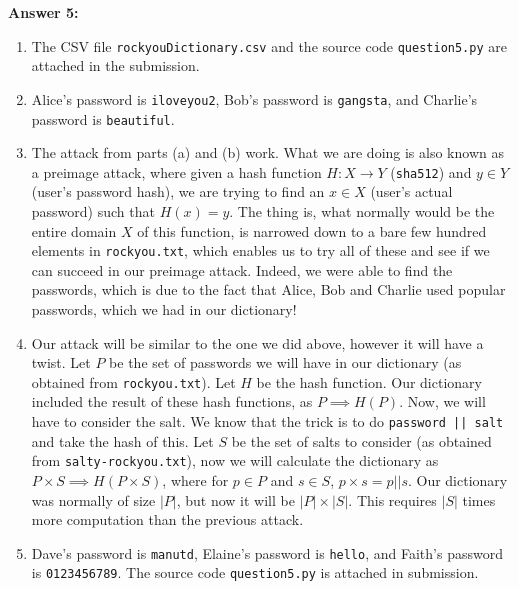 \documentclass[12pt,reqno]{amsart}
\newcommand{\code}[1]{\texttt{#1}}
\begin{document}
\textbf{Answer 5:}
\begin{enumerate}[label=\alph*.]
	\item The CSV file \code{rockyouDictionary.csv} and the source code \code{question5.py} are attached in the submission.
	\item Alice's password is \code{iloveyou2}, Bob's password is \code{gangsta}, and Charlie's password is \code{beautiful}.
	\item The attack from parts (a) and (b) work. What we are doing is also known as a preimage attack, where given a hash function $H : X \xrightarrow{} Y$ (\code{sha512}) and $y \in Y$ (user's password hash), we are trying to find an $x \in X$ (user's actual password) such that $H(x)=y$. The thing is, what normally would be the entire domain $X$ of this function, is narrowed down to a bare few hundred elements in \code{rockyou.txt}, which enables us to try all of these and see if we can succeed in our preimage attack. Indeed, we were able to find the passwords, which is due to the fact that Alice, Bob and Charlie used popular passwords, which we had in our dictionary!
	\item Our attack will be similar to the one we did above, however it will have a twist. Let $P$ be the set of passwords we will have in our dictionary (as obtained from \code{rockyou.txt}). Let $H$ be the hash function. Our dictionary included the result of these hash functions, as $P \implies H(P)$. Now, we will have to consider the salt. We know that the trick is to do \code{password || salt} and take the hash of this. Let $S$ be the set of salts to consider (as obtained from \code{salty-rockyou.txt}), now we will calculate the dictionary as $P \times S \implies H(P \times S)$, where for $p \in P$ and $s \in S$, $p \times s = p || s$. Our dictionary was normally of size $|P|$, but now it will be $|P|\times|S|$. This requires $|S|$ times more computation than the previous attack.
	\item Dave's password is \code{manutd}, Elaine's password is \code{hello}, and Faith's password is \code{0123456789}. The source code \code{question5.py} is attached in submission.
\end{enumerate}


\vspace{20px}
\end{document}
